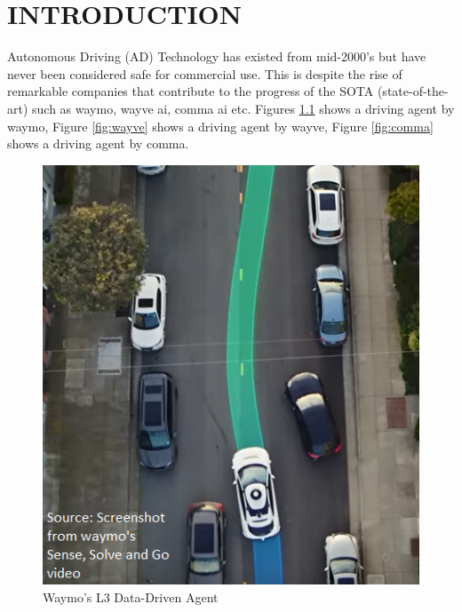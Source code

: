 
\chapter{\uppercase{Introduction}} %
\label{intro} %
\begin{spacing}{1.5} 
\begin{sloppypar}
Autonomous Driving (AD) Technology has existed from mid-2000's but have never been considered safe for commercial use. This is despite the rise of remarkable companies that contribute to the progress of the SOTA (state-of-the-art) such as waymo, wayve ai, comma ai etc. Figures \ref{fig:waymo} shows a driving agent by waymo, Figure \ref{fig:wayve} shows a driving agent by wayve, Figure \ref{fig:comma} shows a driving agent by comma.
\end{sloppypar}
 \end{spacing}
 \begin{figure}[h]
\begin{center}
\includegraphics[scale=1]{1/waymo.png}
\caption{Waymo's L3 Data-Driven Agent}
\label{fig:waymo}
\end{center}
\end{figure}

